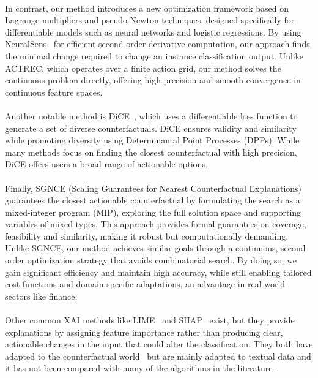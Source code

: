 \documentclass[12pt]{extarticle}
\numberwithin{equation}{section}
\begin{document}
\\
In contrast, our method introduces a new optimization framework based on Lagrange multipliers and pseudo-Newton techniques, designed specifically for differentiable models such as neural networks and logistic regressions. By using NeuralSens~\cite{neuralsens} for efficient second-order derivative computation, our approach finds the minimal change required to change an instance classification output. Unlike ACTREC, which operates over a finite action grid, our method solves the continuous problem directly, offering high precision and smooth convergence in continuous feature spaces.\\
\\
Another notable method is DiCE~\cite{dice}, which uses a differentiable loss function to generate a set of diverse counterfactuals. DiCE ensures validity and similarity while promoting diversity using Determinantal Point Processes (DPPs). While many methods focus on finding the closest counterfactual with high precision, DiCE offers users a broad range of actionable options.\\
\\
Finally, SGNCE (Scaling Guarantees for Nearest Counterfactual Explanations)~\cite{sgnce} guarantees the closest actionable counterfactual by formulating the search as a mixed-integer program (MIP), exploring the full solution space and supporting variables of mixed types. This approach provides formal guarantees on coverage, feasibility and similarity, making it robust but computationally demanding. Unlike SGNCE, our method achieves similar goals through a continuous, second-order optimization strategy that avoids combinatorial search. By doing so, we gain significant efficiency and maintain high accuracy, while still enabling tailored cost functions and domain-specific adaptations, an advantage in real-world sectors like finance. \\
\\
Other common XAI methods like LIME~\cite{lime} and SHAP~\cite{shap} exist, but they provide explanations by assigning feature importance rather than producing clear, actionable changes in the input that could alter the classification. They both have adapted to the counterfactual world~\cite{limecshapc} but are mainly adapted to textual data and it has not been compared with many of the algorithms in the literature~\cite{guidotti2024counterfactual}.\\
\\
\end{document}
